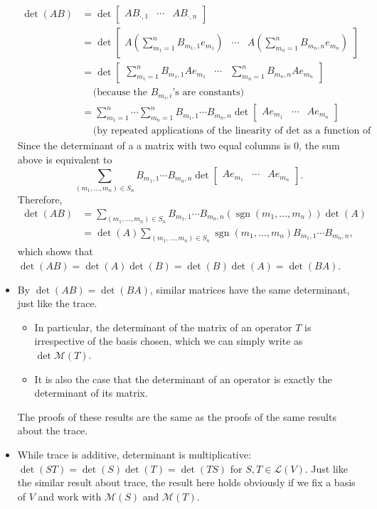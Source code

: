 \documentclass[11pt]{article}
\newcommand{\sgn}{\operatorname{sgn}}
\newcommand{\LV}{\mathcal{L}(V)}
\newcommand{\M}{\mathcal{M}}
\begin{document}
\begin{itemize}
    \begin{align*}
        \det(AB) & = \det \begin{bmatrix}
            AB_{\cdot,1} & \cdots & AB_{\cdot,n}
            \end{bmatrix} \\
            & = \det \begin{bmatrix}
                A(\sum_{m_1 = 1}^n B_{m_1,1}e_{m_1}) & \cdots & A(\sum_{m_n = 1}^n B_{m_n,n}e_{m_n})
            \end{bmatrix} \\
            & = \det \begin{bmatrix}
                \sum_{m_1 = 1}^n B_{m_1,1} Ae_{m_1} & \cdots & \sum_{m_n = 1}^n B_{m_n,n} Ae_{m_n}
            \end{bmatrix} \\
            & \quad \, \text{(because the $B_{m_i,i}$'s are constants)} \\
            & = \sum_{m_1 = 1}^n \cdots \sum_{m_n = 1}^n B_{m_1,1} \cdots B_{m_n,n} \det \begin{bmatrix}
                Ae_{m_1} & \cdots & Ae_{m_n}
            \end{bmatrix} \\
            & \quad \, \text{(by repeated applications of the linearity of det as a function of one column)}
    \end{align*}
    Since the determinant of a a matrix with two equal columns is 0, the sum above is equivalent to  \[\sum_{(m_1,\dots,m_n) \in S_n} B_{m_1,1} \cdots B_{m_n,n} \det \begin{bmatrix}
        Ae_{m_1} & \cdots & Ae_{m_n}
    \end{bmatrix}.\]
    Therefore, \begin{align*}
        \det(AB) & = \sum_{(m_1,\dots,m_n) \in S_n} B_{m_1,1} \cdots B_{m_n,n}(\sgn(m_1,\dots,m_n)) \det(A) \\ & = \det(A) \sum_{(m_1,\dots,m_n) \in S_n} \sgn(m_1,\dots,m_n) B_{m_1,1} \cdots B_{m_n,n},
    \end{align*}
    which shows that $\det(AB) = \det(A)\det(B) = \det(B)\det(A) = \det(BA)$.
    \item By $\det(AB) = \det(BA)$, similar matrices have the same determinant, just like the trace.
    \begin{itemize}
        \item In particular, the determinant of the matrix of an operator $T$ is irrespective of the basis chosen, which we can simply write as $\det \M(T)$.
         \item It is also the case that the determinant of an operator is exactly the determinant of its matrix.
    \end{itemize}
    The proofs of these results are the same as the proofs of the same results about the trace.
    \item While trace is additive, determinant is multiplicative: $\det(ST) = \det(S)\det(T) = \det(TS)$ for $S,T \in \LV$. Just like the similar result about trace, the result here holds obviously if we fix a basis of $V$ and work with $\M(S)$ and $\M(T)$.
\end{itemize}
\end{document}
